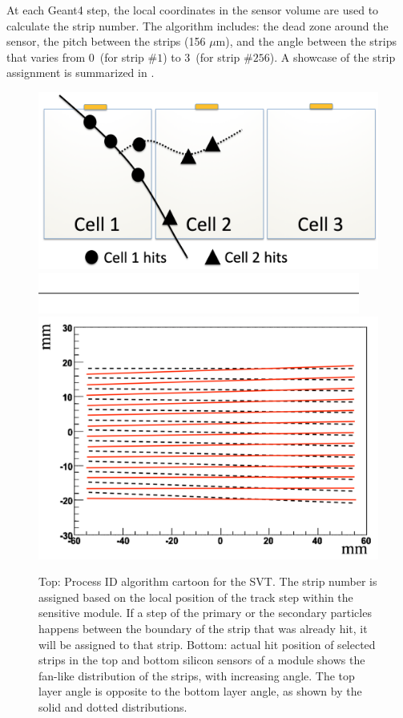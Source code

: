 At each Geant4 step, the local coordinates in the sensor volume are used to calculate the strip number.
The algorithm includes: the dead zone around the sensor, the pitch between the strips (156 $\mu$m), and the angle
between the strips that varies from 0\mdeg \ (for strip $\# 1$) to 3\mdeg \ (for strip  $\# 256$). A showcase of the strip assignment
is summarized in .

\begin{figure}
	\centering
	\includegraphics[width=0.99\columnwidth,keepaspectratio]{img/bstHit.png}
	\includegraphics[width=0.99\columnwidth,keepaspectratio]{img/blank.png}
	\includegraphics[width=0.99\columnwidth,keepaspectratio]{img/bstStrip.png}
	\caption{Top: Process ID algorithm cartoon for the SVT. The strip number is assigned based on the local position of the track
            step within the sensitive module. If a step of the primary or the secondary particles happens between the boundary
            of the strip that was already hit, it will be assigned to that strip. Bottom: actual hit position of selected
            strips in the top and bottom silicon sensors of a module shows the fan-like distribution of the strips,
            with increasing angle. The top layer angle is opposite to the bottom layer angle, as shown by the solid and dotted distributions. }
	\label{fig:processID}
\end{figure}

